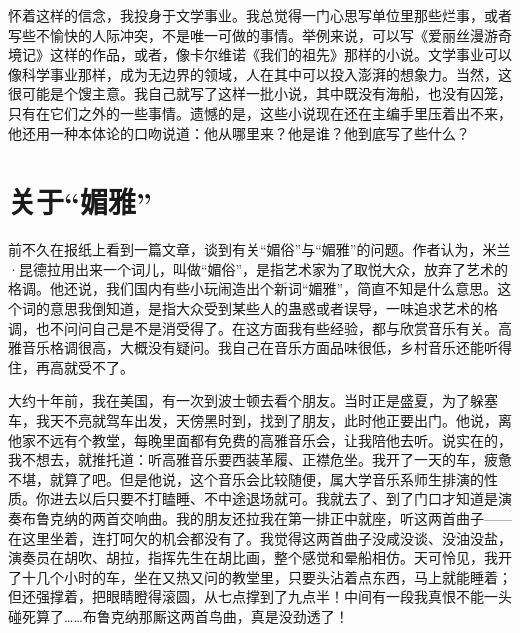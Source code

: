 怀着这样的信念，我投身于文学事业。我总觉得一门心思写单位里那些烂事，或者写些不愉快的人际冲突，不是唯一可做的事情。举例来说，可以写《爱丽丝漫游奇境记》这样的作品，或者，像卡尔维诺《我们的祖先》那样的小说。文学事业可以像科学事业那样，成为无边界的领域，人在其中可以投入澎湃的想象力。当然，这很可能是个馊主意。我自己就写了这样一批小说，其中既没有海船，也没有囚笼，只有在它们之外的一些事情。遗憾的是，这些小说现在还在主编手里压着出不来，他还用一种本体论的口吻说道：他从哪里来？他是谁？他到底写了些什么？　

\chapter{关于“媚雅”}

前不久在报纸上看到一篇文章，谈到有关“媚俗”与“媚雅”的问题。作者认为，米兰·昆德拉用出来一个词儿，叫做“媚俗”，是指艺术家为了取悦大众，放弃了艺术的格调。他还说，我们国内有些小玩闹造出个新词“媚雅”，简直不知是什么意思。这个词的意思我倒知道，是指大众受到某些人的蛊惑或者误导，一味追求艺术的格调，也不问问自己是不是消受得了。在这方面我有些经验，都与欣赏音乐有关。高雅音乐格调很高，大概没有疑问。我自己在音乐方面品味很低，乡村音乐还能听得住，再高就受不了。　 

大约十年前，我在美国，有一次到波士顿去看个朋友。当时正是盛夏，为了躲塞车，我天不亮就驾车出发，天傍黑时到，找到了朋友，此时他正要出门。他说，离他家不远有个教堂，每晚里面都有免费的高雅音乐会，让我陪他去听。说实在的，我不想去，就推托道：听高雅音乐要西装革履、正襟危坐。我开了一天的车，疲惫不堪，就算了吧。但是他说，这个音乐会比较随便，属大学音乐系师生排演的性质。你进去以后只要不打瞌睡、不中途退场就可。我就去了、到了门口才知道是演奏布鲁克纳的两首交响曲。我的朋友还拉我在第一排正中就座，听这两首曲子——在这里坐着，连打呵欠的机会都没有了。我觉得这两首曲子没咸没谈、没油没盐，演奏员在胡吹、胡拉，指挥先生在胡比画，整个感觉和晕船相仿。天可怜见，我开了十几个小时的车，坐在又热又问的教堂里，只要头沾着点东西，马上就能睡着；但还强撑着，把眼睛瞪得滚圆，从七点撑到了九点半！中间有一段我真恨不能一头碰死算了……布鲁克纳那厮这两首鸟曲，真是没劲透了！　 

